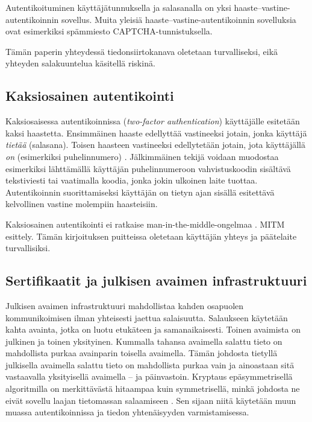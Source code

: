 \documentclass{tktltiki}
\begin{document}
Autentikoituminen käyttäjätunnuksella ja salasanalla on yksi haaste--vastine-autentikoinnin sovellus. 
Muita yleisiä haaste--vastine-autentikoinnin sovelluksia ovat esimerkiksi spämmiesto CAPTCHA-tunnistuksella.

Tämän paperin yhteydessä tiedonsiirtokanava oletetaan turvalliseksi, eikä yhteyden salakuuntelua käsitellä riskinä.


\subsection{Kaksiosainen autentikointi}

Kaksiosaisessa autentikoinnissa (\emph{two-factor authentication}) käyttäjälle esitetään kaksi haastetta. Ensimmäinen haaste edellyttää vastineeksi jotain, jonka käyttäjä \emph{tietää} (salasana). Toisen haasteen vastineeksi edellytetään jotain, jota käyttäjällä \emph{on} (esimerkiksi puhelinnumero) \cite{NIST_SP800-63, google_2step_2010}. Jälkimmäinen tekijä voidaan muodostaa esimerkiksi lähttämällä käyttäjän puhelinnumeroon vahvistuskoodin sisältävä tekstiviesti tai vaatimalla koodia, jonka jokin ulkoinen laite tuottaa. Autentikoinnin suorittamiseksi käyttäjän on tietyn ajan sisällä esitettävä kelvollinen vastine molempiin haasteisiin.

Kaksiosainen autentikointi ei ratkaise man-in-the-middle-ongelmaa \cite{schneier_2factor_2005}. 
MITM esittely.
Tämän kirjoituksen puitteissa oletetaan käyttäjän yhteys ja päätelaite turvallisiksi.


\subsection{Sertifikaatit ja julkisen avaimen infrastruktuuri}

Julkisen avaimen infrastruktuuri mahdollistaa kahden osapuolen kommunikoimisen ilman yhteisesti jaettua salaisuutta. 
Salaukseen käytetään kahta avainta, jotka on luotu etukäteen ja samanaikaisesti. Toinen avaimista on julkinen ja toinen yksityinen. Kummalla tahansa avaimella salattu tieto on mahdollista purkaa avainparin toisella avaimella. Tämän johdosta tietyllä julkisella avaimella salattu tieto on mahdollista purkaa vain ja ainoastaan sitä vastaavalla yksityisellä avaimella -- ja päinvastoin. Kryptaus epäsymmetrisellä algoritmilla on merkittävästä hitaampaa kuin symmetrisellä, minkä johdosta ne eivät sovellu laajan tietomassan salaamiseen \cite{nist_pki_intro, NIST_SP800-63}. Sen sijaan niitä käytetään muun muassa autentikoinnissa ja tiedon yhtenäisyyden varmistamisessa.
\end{document}
